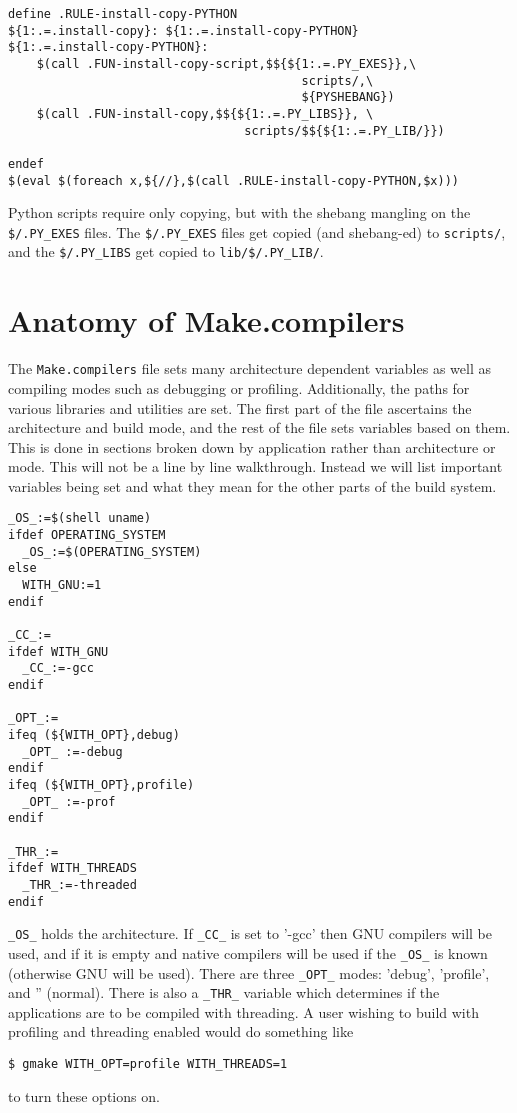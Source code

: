 \documentclass[letterpaper]{article}
\begin{document}
\begin{verbatim}
define .RULE-install-copy-PYTHON
${1:.=.install-copy}: ${1:.=.install-copy-PYTHON}
${1:.=.install-copy-PYTHON}:
	$(call .FUN-install-copy-script,$${${1:.=.PY_EXES}},\
                                         scripts/,\
                                         ${PYSHEBANG})
	$(call .FUN-install-copy,$${${1:.=.PY_LIBS}}, \
                                 scripts/$${${1:.=.PY_LIB/}})

endef
$(eval $(foreach x,${//},$(call .RULE-install-copy-PYTHON,$x)))
\end{verbatim}
Python scripts require only copying, but with the shebang mangling
on the \verb+$/.PY_EXES+ files.  The \verb+$/.PY_EXES+ files get
copied (and shebang-ed) to \verb+scripts/+, and the
\verb+$/.PY_LIBS+ get copied to \verb+lib/$/.PY_LIB/+.

\section{Anatomy of Make.compilers}

The \verb+Make.compilers+ file sets many architecture dependent
variables as well as compiling modes such as debugging or profiling.
Additionally, the paths for various libraries and utilities are set.
The first part of the file ascertains the architecture and build mode,
and the rest of the file sets variables based on them.  This is done
in sections broken down by application rather than architecture or
mode.  This will not be a line by line walkthrough.  Instead we will
list important variables being set and what they mean for the other
parts of the build system.

\begin{verbatim}
_OS_:=$(shell uname)
ifdef OPERATING_SYSTEM
  _OS_:=$(OPERATING_SYSTEM)
else
  WITH_GNU:=1
endif

_CC_:=
ifdef WITH_GNU
  _CC_:=-gcc
endif

_OPT_:=
ifeq (${WITH_OPT},debug)
  _OPT_ :=-debug
endif
ifeq (${WITH_OPT},profile)
  _OPT_ :=-prof
endif

_THR_:=
ifdef WITH_THREADS
  _THR_:=-threaded
endif
\end{verbatim}
\verb+_OS_+ holds the architecture.  If \verb+_CC_+ is set to '-gcc'
then GNU compilers will be used, and if it is empty and native
compilers will be used if the \verb+_OS_+ is known (otherwise GNU
will be used).  There are three \verb+_OPT_+ modes: 'debug', 'profile',
and '' (normal).  There is also a \verb+_THR_+ variable which determines
if the applications are to be compiled with threading.  A user wishing
to build with profiling and threading enabled would do something like
\begin{verbatim}
$ gmake WITH_OPT=profile WITH_THREADS=1
\end{verbatim}
to turn these options on.
\end{document}
